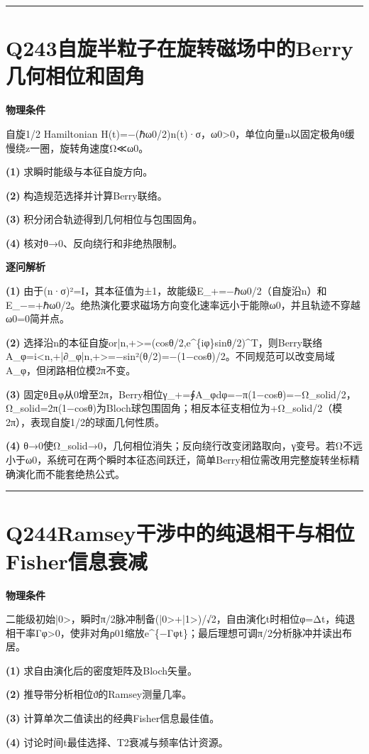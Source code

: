 \documentclass[UTF8,a4paper,11pt,oneside,openany]{ctexbook}
\begin{document}
\par\bigskip\hrule\bigskip
\section*{Q243\quad 自旋半粒子在旋转磁场中的Berry几何相位和固角}
\textbf{物理条件}\par 自旋1/2 Hamiltonian H(t)=−(ℏω0/2)n(t)·σ，ω0>0，单位向量n以固定极角θ缓慢绕z一圈，旋转角速度Ω≪ω0。
\par\noindent\textbf{(1)} 求瞬时能级与本征自旋方向。
\par\noindent\textbf{(2)} 构造规范选择并计算Berry联络。
\par\noindent\textbf{(3)} 积分闭合轨迹得到几何相位与包围固角。
\par\noindent\textbf{(4)} 核对θ→0、反向绕行和非绝热限制。

\par\medskip\noindent\textbf{逐问解析}
\par\noindent\textbf{(1)} 由于(n·σ)²=I，其本征值为±1，故能级E\_+=−ℏω0/2（自旋沿n）和E\_−=+ℏω0/2。绝热演化要求磁场方向变化速率远小于能隙ω0，并且轨迹不穿越ω0=0简并点。
\par\noindent\textbf{(2)} 选择沿n的本征自旋or|n,+>=(cosθ/2,e\textasciicircum{}\{iφ\}sinθ/2)\textasciicircum{}T，则Berry联络A\_φ=i<n,+|∂\_φ|n,+>=−sin²(θ/2)=−(1−cosθ)/2。不同规范可以改变局域A\_φ，但闭路相位模2π不变。
\par\noindent\textbf{(3)} 固定θ且φ从0增至2π，Berry相位γ\_+=∮A\_φdφ=−π(1−cosθ)=−Ω\_solid/2，Ω\_solid=2π(1−cosθ)为Bloch球包围固角；相反本征支相位为+Ω\_solid/2（模2π），表现自旋1/2的球面几何性质。
\par\noindent\textbf{(4)} θ→0使Ω\_solid→0，几何相位消失；反向绕行改变闭路取向，γ变号。若Ω不远小于ω0，系统可在两个瞬时本征态间跃迁，简单Berry相位需改用完整旋转坐标精确演化而不能套绝热公式。

\par\bigskip\hrule\bigskip
\section*{Q244\quad Ramsey干涉中的纯退相干与相位Fisher信息衰减}
\textbf{物理条件}\par 二能级初始|0>，瞬时π/2脉冲制备(|0>+|1>)/√2，自由演化t时相位φ=Δt，纯退相干率Γφ>0，使非对角ρ01缩放e\textasciicircum{}\{−Γφt\}；最后理想可调π/2分析脉冲并读出布居。
\par\noindent\textbf{(1)} 求自由演化后的密度矩阵及Bloch矢量。
\par\noindent\textbf{(2)} 推导带分析相位ϑ的Ramsey测量几率。
\par\noindent\textbf{(3)} 计算单次二值读出的经典Fisher信息最佳值。
\par\noindent\textbf{(4)} 讨论时间t最佳选择、T2衰减与频率估计资源。
\end{document}

